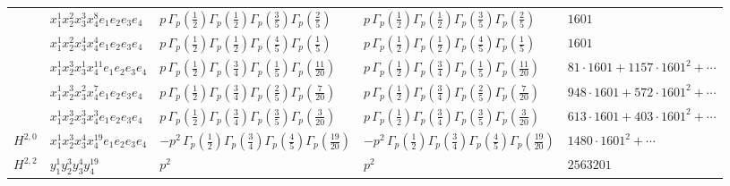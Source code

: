 \documentclass[11pt]{article}
\begin{document}
\begin{table}[ht]
{\begin{tabular}{@{}lllll@{}}
 & $x_{1}^{1} x_{2}^{2} x_{3}^{3} x_{4}^{8}  e_{1} e_{2} e_{3} e_{4}$ & $p \, \Gamma_p \left( \frac{1}{2} \right) \Gamma_p \left( \frac{1}{2} \right) \Gamma_p \left( \frac{3}{5} \right) \Gamma_p \left( \frac{2}{5} \right)$ & $p \, \Gamma_p \left( \frac{1}{2} \right) \Gamma_p \left( \frac{1}{2} \right) \Gamma_p \left( \frac{3}{5} \right) \Gamma_p \left( \frac{2}{5} \right)$ & $1601$ \\
 & $x_{1}^{1} x_{2}^{2} x_{3}^{4} x_{4}^{4}  e_{1} e_{2} e_{3} e_{4}$ & $p \, \Gamma_p \left( \frac{1}{2} \right) \Gamma_p \left( \frac{1}{2} \right) \Gamma_p \left( \frac{4}{5} \right) \Gamma_p \left( \frac{1}{5} \right)$ & $p \, \Gamma_p \left( \frac{1}{2} \right) \Gamma_p \left( \frac{1}{2} \right) \Gamma_p \left( \frac{4}{5} \right) \Gamma_p \left( \frac{1}{5} \right)$ & $1601$ \\
 & $x_{1}^{1} x_{2}^{3} x_{3}^{1} x_{4}^{11}  e_{1} e_{2} e_{3} e_{4}$ & $p \, \Gamma_p \left( \frac{1}{2} \right) \Gamma_p \left( \frac{3}{4} \right) \Gamma_p \left( \frac{1}{5} \right) \Gamma_p \left( \frac{11}{20} \right)$ & $p \, \Gamma_p \left( \frac{1}{2} \right) \Gamma_p \left( \frac{3}{4} \right) \Gamma_p \left( \frac{1}{5} \right) \Gamma_p \left( \frac{11}{20} \right)$ & $81{\cdot}1601{+}1157{\cdot}1601^{2}{+}\cdots$ \\
 & $x_{1}^{1} x_{2}^{3} x_{3}^{2} x_{4}^{7}  e_{1} e_{2} e_{3} e_{4}$ & $p \, \Gamma_p \left( \frac{1}{2} \right) \Gamma_p \left( \frac{3}{4} \right) \Gamma_p \left( \frac{2}{5} \right) \Gamma_p \left( \frac{7}{20} \right)$ & $p \, \Gamma_p \left( \frac{1}{2} \right) \Gamma_p \left( \frac{3}{4} \right) \Gamma_p \left( \frac{2}{5} \right) \Gamma_p \left( \frac{7}{20} \right)$ & $948{\cdot}1601{+}572{\cdot}1601^{2}{+}\cdots$ \\
 & $x_{1}^{1} x_{2}^{3} x_{3}^{3} x_{4}^{3}  e_{1} e_{2} e_{3} e_{4}$ & $p \, \Gamma_p \left( \frac{1}{2} \right) \Gamma_p \left( \frac{3}{4} \right) \Gamma_p \left( \frac{3}{5} \right) \Gamma_p \left( \frac{3}{20} \right)$ & $p \, \Gamma_p \left( \frac{1}{2} \right) \Gamma_p \left( \frac{3}{4} \right) \Gamma_p \left( \frac{3}{5} \right) \Gamma_p \left( \frac{3}{20} \right)$ & $613{\cdot}1601{+}403{\cdot}1601^{2}{+}\cdots$ \\
\midrule
$H^{2,0}$ & $x_{1}^{1} x_{2}^{3} x_{3}^{4} x_{4}^{19}  e_{1} e_{2} e_{3} e_{4}$ & $- p^{2} \, \Gamma_p \left( \frac{1}{2} \right) \Gamma_p \left( \frac{3}{4} \right) \Gamma_p \left( \frac{4}{5} \right) \Gamma_p \left( \frac{19}{20} \right)$ & $- p^{2} \, \Gamma_p \left( \frac{1}{2} \right) \Gamma_p \left( \frac{3}{4} \right) \Gamma_p \left( \frac{4}{5} \right) \Gamma_p \left( \frac{19}{20} \right)$ & $1480{\cdot}1601^{2}{+}\cdots$ \\
\midrule
$H^{2,2}$ & $y_{1}^{1} y_{2}^{3} y_{3}^{4} y_{4}^{19}$ & $p^{2} \,$ & $p^{2} \,$ & $2563201$ \\
\bottomrule
\end{tabular}
}
\renewcommand{\arraystretch}{1.0}
\end{table}
\end{document}
